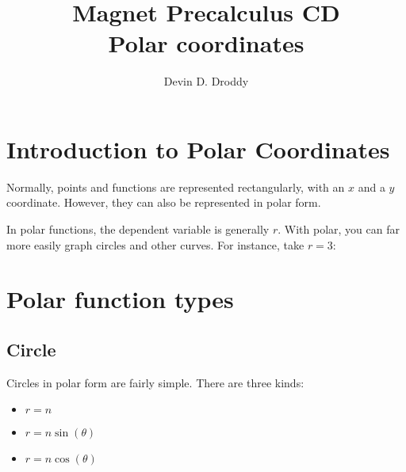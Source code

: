 \documentclass{report}
\title{\Huge{Magnet Precalculus CD}\\Polar coordinates}
\author{\huge{Devin D. Droddy}}
\date{}
\begin{document}
    \maketitle
    \newpage%
    \tableofcontents
    \pagebreak

    \chapter{Introduction to Polar Coordinates}

    Normally, points and functions are represented rectangularly, with an $x$ and a $y$ coordinate. However, they can also be represented in polar form.

    In polar functions, the dependent variable is generally $r$. With polar, you can far more easily graph circles and other curves. For instance, take $r=3$:
    \begin{center}
    \end{center}

    \chapter{Polar function types}
    \section{Circle}

    Circles in polar form are fairly simple. There are three kinds:
    \begin{itemize}
        \item $r=n$
        \item $r=n\sin(\theta)$
        \item $r=n\cos(\theta)$
    \end{itemize}
\end{document}
